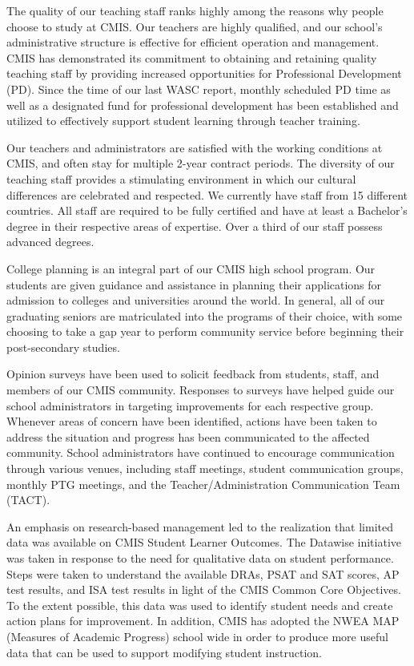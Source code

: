 The quality of our teaching staff ranks highly among the reasons why people choose to study at CMIS. Our teachers are highly qualified, and our school's administrative structure is effective for efficient operation and management. CMIS has demonstrated its commitment to obtaining and retaining quality teaching staff by providing increased opportunities for Professional Development (PD). Since the time of our last WASC report, monthly scheduled PD time as well as a designated fund for professional development has been established and utilized to effectively support student learning through teacher training.

Our teachers and administrators are satisfied with the working conditions at CMIS, and often stay for multiple 2-year contract periods. The diversity of our teaching staff provides a stimulating environment in which our cultural differences are celebrated and respected. We currently have staff from 15 different countries. All staff are required to be fully certified and have at least a Bachelor's degree in their respective areas of expertise. Over a third of our staff possess advanced degrees.

College planning is an integral part of our CMIS high school program. Our students are given guidance and assistance in planning their applications for admission to colleges and universities around the world. In general, all of our graduating seniors are matriculated into the programs of their choice, with some choosing to take a gap year to perform community service before beginning their post-secondary studies. 

Opinion surveys have been used to solicit feedback from students, staff, and members of our CMIS community. Responses to surveys have helped guide our school administrators in targeting improvements for each respective group. Whenever areas of concern have been identified, actions have been taken to address the situation and progress has been communicated to the affected community. School administrators have continued to encourage communication through various venues, including staff meetings, student communication groups, monthly PTG meetings, and the Teacher/Administration Communication Team (TACT). 

An emphasis on research-based management led to the realization that limited data was available on CMIS Student Learner Outcomes. The Datawise initiative was taken in response to the need for qualitative data on student performance. Steps were taken to understand the available DRAs, PSAT and SAT scores, AP test results, and ISA test results in light of the CMIS Common Core Objectives. To the extent possible, this data was used to identify student needs and create action plans for improvement. In addition, CMIS has adopted the NWEA MAP (Measures of Academic Progress) school wide in order to produce more useful data that can be used to support modifying student instruction.  

